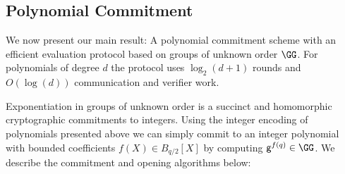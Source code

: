 \documentclass{article}
\theoremstyle{definition}
\begin{document}
\subsection{Polynomial Commitment}

We now present our main result: 
A polynomial commitment scheme with an efficient evaluation protocol based on groups of unknown order $\GG$. For polynomials of degree $d$ the protocol uses $\log_2(d+1)$ rounds and $O(\log(d))$ communication and verifier work.

Exponentiation in groups of unknown order is a succinct and homomorphic cryptographic commitments to integers.
Using the integer encoding of polynomials presented above we can simply commit to an integer polynomial with bounded coefficients $f(X)\in B_{q/2}[X]$ by computing $\gr{g}^{f(q)} \in \GG$. We describe the commitment and opening algorithms below:
\end{document}
